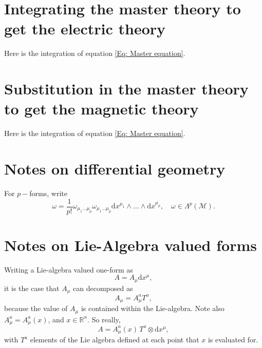 \documentclass{article}
\begin{document}
\section{Integrating the master theory to get the electric theory}
\label{appendixmagneticintegration}
Here is the integration of equation \eqref{Eq: Master equation}. 


\section{Substitution in the master theory to get the magnetic theory}
\label{appendixelectricsubstitution}
Here is the integration of equation \eqref{Eq: Master equation}. 


\section{Notes on differential geometry}
For $p-$forms, write
\begin{equation}
    \omega = \frac{1}{p!}\omega_{\mu_{1}\ldots\mu_{p}}\omega_{\mu_{1}\ldots\mu_{p}}\mathrm{d}x^{\mu_{1}}\wedge \ldots\wedge\mathrm{d}x^{\mu_{p}},\quad \omega\in \Lambda^{p}\left(\mathcal{M}\right).
\end{equation}

\section{Notes on Lie-Algebra valued forms}
Writing a Lie-algebra valued one-form as 
\begin{equation}
    A = A_{\mu}\mathrm{d}x^{\mu},
\end{equation}
it is the case that $A_{\mu}$ can decomposed as 
\begin{equation}
    A_{\mu} = A_{\mu}^{a}T^{a},
\end{equation}
because the value of $A_{\mu}$ is contained within the Lie-algebra. Note also $A_{\mu}^{a} = A_{\mu}^{a}(x)$, and $x\in \mathbb{R}^{n}$. So really,
\begin{equation}
    A = A_{\mu}^{a}(x)\, T^{a}\otimes \mathrm{d}x^{\mu},
\end{equation}
with $T^{a}$ elements of the Lie algebra defined at each point that $x$ is evaluated for. \newline
\end{document}
